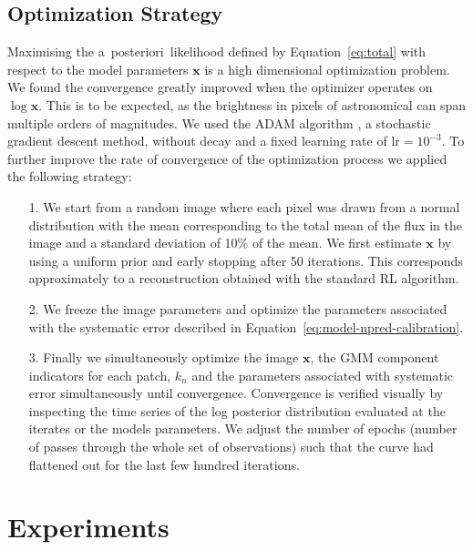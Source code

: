\documentclass[twocolumn, linenumbers]{aastex631}
\newcommand{\aposteriori}{a~posteriori~}
\begin{document}
    \subsection{Optimization Strategy}
    \label{sec:opt-strategy}
    Maximising the \aposteriori likelihood defined by Equation~\ref{eq:total} with respect to the model parameters $\mathbf{x}$ is a high dimensional optimization problem. We found the convergence greatly improved when the optimizer operates on $\log{\mathbf{x}}$. This is to be expected, as the brightness in pixels of astronomical can span multiple orders of magnitudes. We used the ADAM algorithm \citep{Kingma2014}, a stochastic gradient descent method, without decay and a fixed learning rate of $\mathrm{lr}=10^{-3}$. To further improve the rate of convergence of the optimization process we applied the following strategy:

    \begin{itemize}
        \item[1.] We start from a random image where each pixel was drawn from a normal distribution with the mean corresponding to the total mean of the flux in the image and a standard deviation of 10\% of the mean. We first estimate $\mathbf{x}$ by using a uniform prior and early stopping after 50 iterations. This corresponds approximately to a reconstruction obtained with the standard RL algorithm. 
        \item[2.] We freeze the image parameters and optimize the parameters associated with the systematic error described in Equation~\ref{eq:model-npred-calibration}.
        \item[3.] Finally we simultaneously optimize
        the image $\mathbf{x}$, the GMM component indicators for each patch, $k_n$ and the parameters associated with systematic error simultaneously until convergence. Convergence is verified visually by inspecting the time series of the log posterior distribution evaluated at the iterates or the models parameters. We adjust the number of epochs (number of passes through the whole set of observations) such that the curve had flattened out for the last few hundred iterations.
    \end{itemize}
    
    \section{Experiments}
\end{document}
